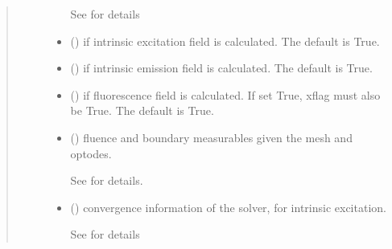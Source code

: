 \documentclass[letterpaper,10pt,english]{sphinxmanual}
\begin{document}
\begin{fulllineitems}
\begin{fulllineitems}
\begin{quote}
\begin{description}
\begin{itemize}
\sphinxAtStartPar
See {\hyperref[\detokenize{_autosummary/nirfasterff.utils.SolverOptions:nirfasterff.utils.SolverOptions}]{}} for details


\item {} 
\sphinxAtStartPar
{} (\sphinxstyleliteralemphasis{\sphinxupquote{, }}) \textendash{} if intrinsic excitation field is calculated. The default is True.

\item {} 
\sphinxAtStartPar
{} (\sphinxstyleliteralemphasis{\sphinxupquote{, }}) \textendash{} if intrinsic emission field is calculated. The default is True.

\item {} 
\sphinxAtStartPar
{} (\sphinxstyleliteralemphasis{\sphinxupquote{, }}) \textendash{} if fluorescence field is calculated. If set True, xflag must also be True. The default is True.

\end{itemize}

\sphinxAtStartPar
\begin{itemize}
\item {} 
\sphinxAtStartPar
{} () \textendash{} fluence and boundary measurables given the mesh and optodes.

\sphinxAtStartPar
See {\hyperref[\detokenize{_autosummary/nirfasterff.base.data.FLdata:nirfasterff.base.data.FLdata}]{}} for details.

\item {} 
\sphinxAtStartPar
{} () \textendash{} convergence information of the solver, for intrinsic excitation.

\sphinxAtStartPar
See {\hyperref[\detokenize{_autosummary/nirfasterff.utils.ConvergenceInfo:nirfasterff.utils.ConvergenceInfo}]{}} for details


\end{itemize}
\end{description}
\end{quote}
\end{fulllineitems}
\end{fulllineitems}
\end{document}

